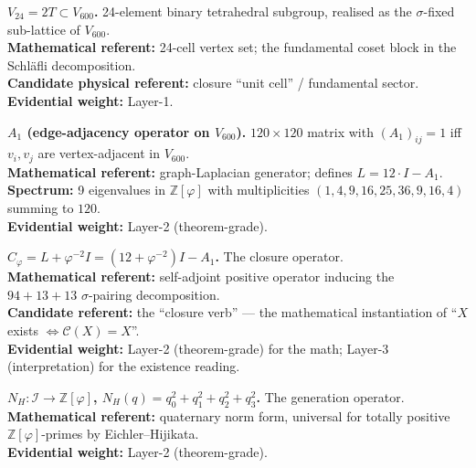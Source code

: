 \documentclass[11pt,a4paper]{article}
\newcommand{\II}{\mathcal{I}}
\newcommand{\Vsix}{V_{600}}
\newcommand{\Vtf}{V_{24}}
\newcommand{\Cphi}{C_\varphi}
\newcommand{\NH}{N_H}
\newcommand{\Z}{\mathbb{Z}}
\begin{document}
\begin{dictionarybox}
\textbf{$\Vtf = 2T \subset \Vsix$.} 24-element binary tetrahedral
subgroup, realised as the $\sigma$-fixed sub-lattice of $\Vsix$.
\\[0.3em]
\textbf{Mathematical referent:} 24-cell vertex set; the
fundamental coset block in the Schl\"afli decomposition.\\
\textbf{Candidate physical referent:} closure ``unit cell'' /
fundamental sector.\\
\textbf{Evidential weight:} Layer-1.
\end{dictionarybox}

\begin{dictionarybox}
\textbf{$A_1$ (edge-adjacency operator on $\Vsix$).} $120 \times 120$
matrix with $(A_1)_{ij} = 1$ iff $v_i, v_j$ are vertex-adjacent in
$\Vsix$.
\\[0.3em]
\textbf{Mathematical referent:} graph-Laplacian generator; defines
$L = 12 \cdot I - A_1$.\\
\textbf{Spectrum:} 9 eigenvalues in $\Z[\varphi]$ with
multiplicities $(1, 4, 9, 16, 25, 36, 9, 16, 4)$ summing to $120$.\\
\textbf{Evidential weight:} Layer-2 (theorem-grade).
\end{dictionarybox}

\begin{dictionarybox}
\textbf{$\Cphi = L + \varphi^{-2} I = (12 + \varphi^{-2}) I - A_1$.}
The closure operator.
\\[0.3em]
\textbf{Mathematical referent:} self-adjoint positive operator
inducing the $94 + 13 + 13$ $\sigma$-pairing decomposition.\\
\textbf{Candidate referent:} the ``closure verb'' --- the
mathematical instantiation of ``$X$ exists $\iff
\mathcal{C}(X) = X$''.\\
\textbf{Evidential weight:} Layer-2 (theorem-grade) for the math;
Layer-3 (interpretation) for the existence reading.
\end{dictionarybox}

\begin{dictionarybox}
\textbf{$\NH : \II \to \Z[\varphi]$,
$\NH(q) = q_0^2 + q_1^2 + q_2^2 + q_3^2$.} The generation
operator.
\\[0.3em]
\textbf{Mathematical referent:} quaternary norm form, universal
for totally positive $\Z[\varphi]$-primes by Eichler--Hijikata.\\
\textbf{Evidential weight:} Layer-2 (theorem-grade).
\end{dictionarybox}
\end{document}
